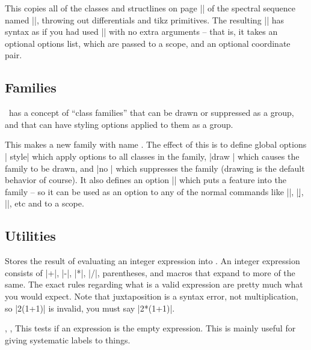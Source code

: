 \begin{sseqdata}[name = basic, cohomological Serre grading]
\begin{command}{\SseqCopyPage{}}
This copies all of the classes and structlines on page || of the spectral sequence named ||, throwing out differentials and tikz primitives. The resulting || has syntax as if you had used |\DeclareSseqGroup| with no extra arguments -- that is, it takes an optional options list, which are passed to a scope, and an optional coordinate pair.
\end{command}

\subsection{Families}
\spectralsequences\ has a concept of ``class families'' that can be drawn or suppressed as a group, and that can have styling options applied to them as a group.
\begin{command}{\SseqNewFamily{}}
This makes a new family with name . The effect of this is to define global options | style| which apply options to all classes in the family, |draw | which causes the family to be drawn, and |no | which suppresses the family (drawing is the default behavior of course). It also defines an option || which puts a feature into the family -- so it can be used as an option to any of the normal commands like |\class|, |\d|, |\structline|, etc and to a scope.

\codeexample[vbox, from file=imJ]
\end{command}


\subsection{Utilities}
\begin{command}{\SseqParseInt{}}
Stores the result of evaluating an integer expression into . An integer expression consists of |+|, |-|, |*|, |/|, parentheses, and macros that expand to more of the same. The exact rules regarding what is a valid expression are pretty much what you would expect. Note that juxtaposition is a syntax error, not multiplication, so |2(1+1)| is invalid, you must say |2*(1+1)|.
\end{command}

\begin{commandlist}{
    \SseqIfEmptyTF{},
    \SseqIfEmptyT{},
    \SseqIfEmptyF{}
}
This tests if an expression is the empty expression. This is mainly useful for giving systematic labels to things.
\end{commandlist}


\end{sseqdata}
